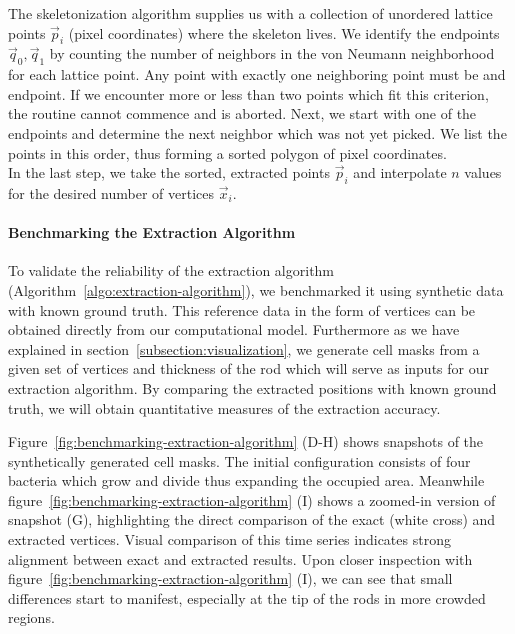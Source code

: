 The skeletonization algorithm supplies us with a collection of unordered lattice
points $\vec{p}_i$
(pixel coordinates) where the skeleton lives.
We identify the endpoints $\vec{q}_0,\vec{q}_1$ by counting the number of neighbors in the von
Neumann neighborhood for each lattice point.
Any point with exactly one neighboring point must be and endpoint.
If we encounter more or less than two points which fit this criterion, the routine
cannot commence
and is aborted.
Next, we start with one of the endpoints and determine the next neighbor which was
not yet picked.
We list the points in this order, thus forming a sorted polygon of pixel coordinates.\\
In the last step, we take the sorted, extracted points $\vec{p}_i$ and interpolate
$n$ values for
the desired number of vertices $\vec{x}_i$.

\paragraph{Benchmarking the Extraction Algorithm}

To validate the reliability of the extraction algorithm
(Algorithm~\ref{algo:extraction-algorithm}), we benchmarked it using synthetic data with known
ground truth.
This reference data in the form of vertices can be obtained directly from our
computational model.
Furthermore as we have explained in section~\ref{subsection:visualization}, we
generate cell masks
from a given set of vertices and thickness of the rod which will serve as inputs for
our extraction
algorithm.
By comparing the extracted positions with known ground truth, we will obtain
quantitative measures
of the extraction accuracy.

Figure~\ref{fig:benchmarking-extraction-algorithm} (D-H) shows snapshots of the synthetically
generated cell masks.
The initial configuration consists of four bacteria which grow and divide thus expanding the
occupied area.
Meanwhile figure~\ref{fig:benchmarking-extraction-algorithm} (I) shows a zoomed-in version of
snapshot (G), highlighting the direct comparison of the exact (white cross) and
extracted vertices.
Visual comparison of this time series indicates strong alignment between exact and extracted
results.
Upon closer inspection with figure~\ref{fig:benchmarking-extraction-algorithm} (I), we can see
that small differences start to manifest, especially at the tip of the rods in more
crowded regions.

